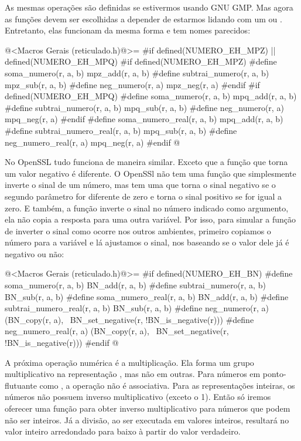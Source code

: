 As mesmas operações são definidas se estivermos usando GNU GMP. Mas
agora as funções devem ser escolhidas a depender de estarmos lidando
com um  ou . Entretanto, elas
funcionam da mesma forma e tem nomes parecidos:

\iniciocodigo
@<Macros Gerais (reticulado.h)@>=
#if defined(NUMERO_EH_MPZ) || defined(NUMERO_EH_MPQ)
#if defined(NUMERO_EH_MPZ)
#define soma_numero(r, a, b) mpz_add(r, a, b)
#define subtrai_numero(r, a, b) mpz_sub(r, a, b)
#define neg_numero(r, a) mpz_neg(r, a)
#endif
#if defined(NUMERO_EH_MPQ)
#define soma_numero(r, a, b) mpq_add(r, a, b)
#define subtrai_numero(r, a, b) mpq_sub(r, a, b)
#define neg_numero(r, a) mpq_neg(r, a)
#endif
#define soma_numero_real(r, a, b) mpq_add(r, a, b)
#define subtrai_numero_real(r, a, b) mpq_sub(r, a, b)
#define neg_numero_real(r, a) mpq_neg(r, a)
#endif
@
\fimcodigo


No OpenSSL tudo funciona de maneira similar. Exceto que a função que
torna um valor negativo é diferente. O OpenSSl não tem uma função que
simplesmente inverte o sinal de um número, mas tem uma que torna o
sinal negativo se o segundo parâmetro for diferente de zero e torna o
sinal positivo se for igual a zero. E também, a função inverte o sinal
no número indicado como argumento, ela não copia a resposta para uma
outra variável. Por isso, para simular a função de inverter o sinal
como ocorre nos outros ambientes, primeiro copiamos o número para a
variável  e lá ajustamos o sinal, nos baseando se o
valor dele já é negativo ou não:

\iniciocodigo
@<Macros Gerais (reticulado.h)@>=
#if defined(NUMERO_EH_BN)
#define soma_numero(r, a, b) BN_add(r, a, b)
#define subtrai_numero(r, a, b) BN_sub(r, a, b)
#define soma_numero_real(r, a, b) BN_add(r, a, b)
#define subtrai_numero_real(r, a, b) BN_sub(r, a, b)
#define neg_numero(r, a) (BN_copy(r, a),                    \
                          BN_set_negative(r, !BN_is_negative(r)))
#define neg_numero_real(r, a) (BN_copy(r, a),                    \
                               BN_set_negative(r, !BN_is_negative(r)))
#endif
@
\fimcodigo

A próxima operação numérica é a multiplicação. Ela forma um grupo
multiplicativo na representação , mas não em
outras. Para números em ponto-flutuante como \monoespaco{double}, a
operação não é associativa. Para as representações inteiras, os
números não possuem inverso multiplicativo (exceto o 1). Então só
iremos oferecer uma função para obter inverso multiplicativo para
números que podem não ser inteiros. Já a divisão, ao ser executada em
valores inteiros, resultará no valor inteiro arredondado para baixo à
partir do valor verdadeiro.

